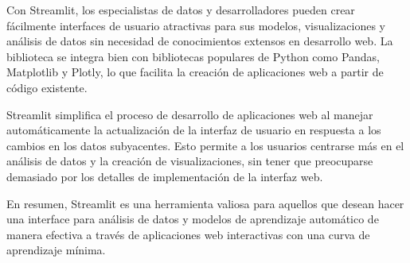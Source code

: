 Con Streamlit, los especialistas de datos y desarrolladores pueden crear fácilmente interfaces de usuario atractivas para sus modelos, visualizaciones y análisis de datos sin necesidad de conocimientos extensos en desarrollo web. La biblioteca se integra bien con bibliotecas populares de Python como Pandas, Matplotlib y Plotly, lo que facilita la creación de aplicaciones web a partir de código existente\cite{Streamlit}.

Streamlit simplifica el proceso de desarrollo de aplicaciones web al manejar automáticamente la actualización de la interfaz de usuario en respuesta a los cambios en los datos subyacentes. Esto permite a los usuarios centrarse más en el análisis de datos y la creación de visualizaciones, sin tener que preocuparse demasiado por los detalles de implementación de la interfaz web.

En resumen, Streamlit es una herramienta valiosa para aquellos que desean hacer una interface para análisis de datos y modelos de aprendizaje automático de manera efectiva a través de aplicaciones web interactivas con una curva de aprendizaje mínima.